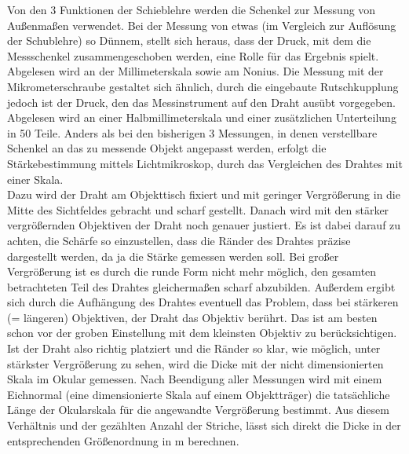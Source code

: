 \documentclass[12pt,a4paper]{article}
\begin{document}
\begin{multicols}{2}
Von den 3 Funktionen der Schieblehre werden die Schenkel zur Messung von Außenmaßen verwendet. Bei der Messung von etwas (im Vergleich zur Auflösung der Schublehre) so Dünnem, stellt sich heraus, dass der Druck, mit dem die Messschenkel zusammengeschoben werden, eine Rolle für das Ergebnis spielt.\\
Abgelesen wird an der Millimeterskala sowie am Nonius.
Die Messung mit der Mikrometerschraube gestaltet sich ähnlich, durch die eingebaute Rutschkupplung jedoch ist der Druck, den das Messinstrument auf den Draht ausübt vorgegeben. Abgelesen wird an einer Halbmillimeterskala und einer zusätzlichen Unterteilung in 50 Teile.
Anders als bei den bisherigen 3 Messungen, in denen verstellbare Schenkel an das zu messende Objekt angepasst werden, erfolgt die Stärkebestimmung mittels Lichtmikroskop, durch das Vergleichen des Drahtes mit einer Skala.\\
Dazu wird der Draht am Objekttisch fixiert und mit geringer Vergrößerung in die Mitte des Sichtfeldes gebracht und scharf gestellt. Danach wird mit den stärker vergrößernden Objektiven der Draht noch genauer justiert. Es ist dabei darauf zu achten, die Schärfe so einzustellen, dass die Ränder des Drahtes präzise dargestellt werden, da ja die Stärke gemessen werden soll. Bei großer Vergrößerung ist es durch die runde Form nicht mehr möglich, den gesamten betrachteten Teil des Drahtes gleichermaßen scharf abzubilden.
Außerdem ergibt sich durch die Aufhängung des Drahtes eventuell das Problem, dass bei stärkeren (= längeren) Objektiven, der Draht das Objektiv berührt. Das ist am besten schon vor der groben Einstellung mit dem kleinsten Objektiv zu berücksichtigen.\\
Ist der Draht also richtig platziert und die Ränder so klar, wie möglich, unter stärkster Vergrößerung zu sehen, wird die Dicke mit der nicht dimensionierten Skala im Okular gemessen. Nach Beendigung aller Messungen wird mit einem Eichnormal (eine dimensionierte Skala auf einem Objektträger) die tatsächliche Länge der Okularskala für die angewandte Vergrößerung bestimmt.
Aus diesem Verhältnis und der gezählten Anzahl der Striche, lässt sich direkt die Dicke in der entsprechenden Größenordnung in m berechnen.\\

\end{multicols}
\end{document}
